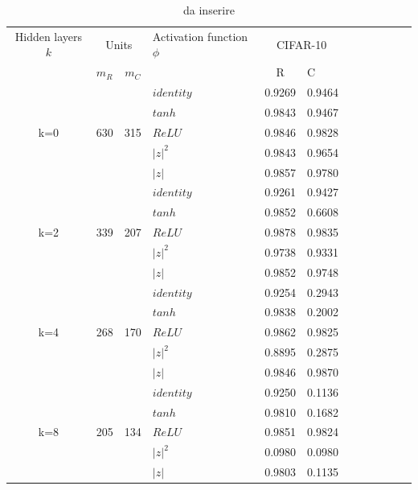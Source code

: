 \documentclass[a4paper,10pt]{article}
\begin{document}
 \begin{table}
  \centering
  \begin{tabular}{cp{} cp{} cp{}   cp{} cp{} cp{}}
   \cline{1-6}
   Hidden layers $k$ & \multicolumn{2}{c}{Units} $p_R$ & Activation function $\phi$ & \multicolumn{2}{c}{CIFAR-10}\\
   \cline{2-3} \cline{5-6}
   & $m_R$ & $m_C$ & & R & C \\
   \cline{1-6}
   & & & $identity$ & 0.9269 & 0.9464 \\
   \cline{4-6}
   & & & $tanh$ & 0.9843 & 0.9467 \\
   \cline{4-6}
   k=0 & 630 & 315 & $ReLU$ & 0.9846 & 0.9828 \\
   \cline{4-6}
   & & & $|z|^2$ & 0.9843 & 0.9654 \\
   \cline{4-6}
   & & & $|z|$ & 0.9857 & 0.9780 \\
   \cline{1-6}
   
   \cline{1-6}
   & & & $identity$ & 0.9261 & 0.9427 \\
   \cline{4-6}
   & & & $tanh$ & 0.9852 & 0.6608 \\
   \cline{4-6}
   k=2 & 339 & 207 & $ReLU$ & 0.9878 & 0.9835 \\
   \cline{4-6}
   & & & $|z|^2$ & 0.9738 & 0.9331 \\
   \cline{4-6}
   & & & $|z|$ & 0.9852 & 0.9748 \\
   \cline{1-6}
   
   \cline{1-6}
   & & & $identity$ & 0.9254 & 0.2943 \\
   \cline{4-6}
   & & & $tanh$ & 0.9838 & 0.2002 \\
   \cline{4-6}
   k=4 & 268 & 170 & $ReLU$ & 0.9862 & 0.9825 \\
   \cline{4-6}
   & & & $|z|^2$ & 0.8895 & 0.2875 \\
   \cline{4-6}
   & & & $|z|$ & 0.9846 & 0.9870 \\
   \cline{1-6}
   
   \cline{1-6}
   & & & $identity$ & 0.9250 & 0.1136 \\
   \cline{4-6}
   & & & $tanh$ & 0.9810 & 0.1682 \\
   \cline{4-6}
   k=8 & 205 & 134 & $ReLU$ & 0.9851 & 0.9824 \\
   \cline{4-6}
   & & & $|z|^2$ & 0.0980 & 0.0980 \\
   \cline{4-6}
   & & & $|z|$ & 0.9803 & 0.1135 \\
   \cline{1-6}
      
  \end{tabular}
  \caption{da inserire}
  \label{CIFAR-102Tab}
 \end{table}
 
\end{document}
